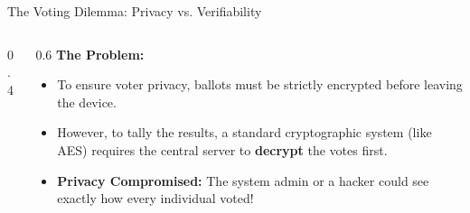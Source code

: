 \documentclass[aspectratio=169, 10pt]{beamer}
\begin{document}
\begin{frame}{The Voting Dilemma: Privacy vs. Verifiability}
\begin{columns}
\begin{column}{0.4\textwidth}
{
            }
        \end{column}
        
        \begin{column}{0.6\textwidth}
            \textbf{The Problem:}
            \begin{itemize}
                \item To ensure voter privacy, ballots must be strictly encrypted before leaving the device.
                \item However, to tally the results, a standard cryptographic system (like AES) requires the central server to \textbf{decrypt} the votes first.
                \item \textbf{Privacy Compromised:} The system admin or a hacker could see exactly how every individual voted!
            \end{itemize}
        \end{column}
    \end{columns}
\end{frame}
\end{document}
